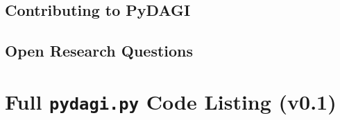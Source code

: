 \documentclass{amsbook}
\theoremstyle{definition}
\theoremstyle{remark}
\numberwithin{equation}{chapter} %
\begin{document}
    \section{Contributing to PyDAGI}
    \section{Open Research Questions}

\appendix %
\chapter{Full \texttt{pydagi.py} Code Listing (v0.1)}
\end{document}
